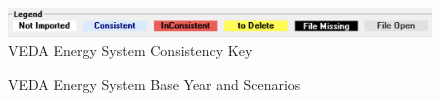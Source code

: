 \documentclass[12pt]{article}
\begin{document}
\begin{figure}[H]
    \centering
    \includegraphics[width = \textwidth]{VEDAConsistent.png}
	\caption{VEDA Energy System Consistency Key}
	\label{fig:C}%
\end{figure}

\begin{figure}[H]
    \centering
	\caption{VEDA Energy System Base Year and Scenarios}
	\label{fig:BYS}%
\end{figure}
\end{document}
